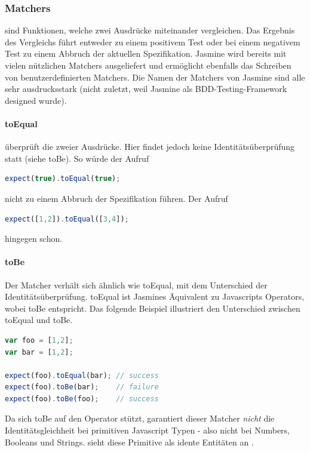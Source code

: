 \subsubsection{Matchers}
 sind Funktionen, welche zwei Ausdrücke miteinander vergleichen. Das Ergebnis des Vergleichs führt entweder zu einem positivem Test oder bei einem negativem Test zu einem Abbruch der aktuellen Spezifikation. Jasmine wird bereits mit vielen nützlichen Matchers ausgeliefert und ermöglicht ebenfalls das Schreiben von benutzerdefinierten Matchers. Die Namen der Matchers von Jasmine sind alle sehr ausdrucksstark (nicht zuletzt, weil Jasmine als BDD-Testing-Framework designed wurde).

\paragraph{toEqual}
 überprüft die  zweier Ausdrücke. Hier findet jedoch keine Identitätsüberprüfung statt (siehe toBe). So würde der Aufruf
\begin{lstlisting}[language=JavaScript]
  expect(true).toEqual(true);
\end{lstlisting}
nicht zu einem Abbruch der Spezifikation führen. Der Aufruf
\begin{lstlisting}[language=JavaScript]
  expect([1,2]).toEqual([3,4]);
\end{lstlisting}
hingegen schon.

\paragraph{toBe}
Der Matcher  verhält sich ähnlich wie toEqual, mit dem Unterschied der Identitätsüberprüfung. toEqual ist Jasmines Äquivalent zu Javascripts \glqq{==\grqq} Operators, wobei toBe \glqq{===\grqq} entspricht. Das folgende Beispiel illustriert den Unterschied zwischen toEqual und toBe.

\begin{lstlisting}[language=JavaScript]
var foo = [1,2];
var bar = [1,2];

expect(foo).toEqual(bar); // success
expect(foo).toBe(bar);    // failure
expect(foo).toBe(foo);    // success
\end{lstlisting}

Da sich toBe auf den \glqq{===\grqq} Operator stützt, garantiert dieser Matcher \textit{nicht} die Identitätsgleichheit bei primitiven Javascript Typen - also nicht bei Numbers, Booleans und Strings. \glqq{===\grqq} sieht diese Primitive als idente Entitäten an \autocite[16]{Hahn:2013}.

